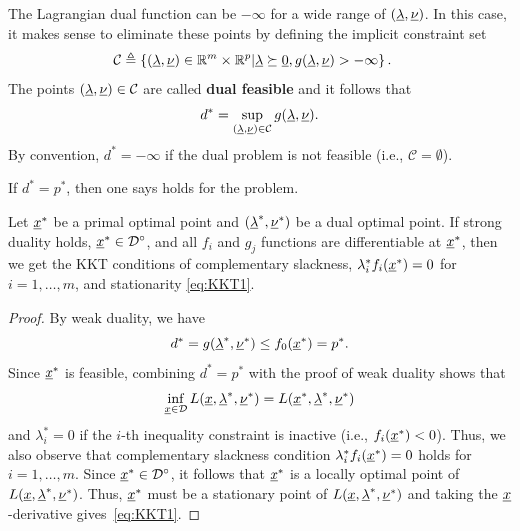 The Lagrangian dual function can be $-\infty$ for a wide range of $(\underline{\lambda},\underline{\nu})$.
In this case, it makes sense to eliminate these points by defining the implicit constraint set
\begin{align*}
\mathcal{C} &\triangleq \left\{ (\underline{\lambda},\underline{\nu}) \in \mathbb{R}^m \times \mathbb{R}^p | \underline{\lambda}\succeq \underline{0},  g(\underline{\lambda},\underline{\nu}) > -\infty \right\}.
\end{align*}
The points $(\underline{\lambda},\underline{\nu}) \in \mathcal{C}$ are called \textbf{dual feasible} and it follows that
\[ d^* = \sup_{(\underline{\lambda},\underline{\nu})\in \mathcal{C}} g(\underline{\lambda},\underline{\nu}). \]
By convention, $d^* = -\infty$ if the dual problem is not feasible (i.e., $\mathcal{C} = \emptyset$).

\begin{definition}
If $d^* = p^*$, then one says  holds for the problem.
\end{definition}

\begin{theorem}
Let $\underline{x}^*$ be a primal optimal point and $(\underline{\lambda}^*,\underline{\nu}^*)$ be a dual optimal point.
If strong duality holds, $\underline{x}^* \in {\mathcal{D}}^{\circ}$, and all $f_i$ and $g_j$ functions are differentiable at $\underline{x}^*$, then we get the KKT conditions of complementary slackness, $\lambda_i^* f_i (\underline{x}^*) = 0$ for $i = 1,\ldots,m$, and stationarity \eqref{eq:KKT1}.
\end{theorem}
\begin{proof}
By weak duality, we have
\[ d^* = g(\underline{\lambda}^*,\underline{\nu}^*) \leq f_0 (\underline{x}^*) = p^*. \]
Since $\underline{x}^*$ is feasible, combining $d^* = p^*$ with the proof of weak duality shows that
\[ \inf_{\underline{x}\in \mathcal{D}} L(\underline{x},\underline{\lambda}^*,\underline{\nu}^*) = L(\underline{x}^*,\underline{\lambda}^*,\underline{\nu}^*) \]
and $\lambda_i^* = 0$ if the $i$-th inequality constraint is inactive (i.e., $f_i(\underline{x}^*) < 0$).
Thus, we also observe that complementary slackness condition $\lambda_i^* f_i (\underline{x}^*) = 0$ holds for $i = 1,\ldots,m$.
Since $\underline{x}^* \in {\mathcal{D}}^{\circ}$, it follows that $\underline{x}^*$ is a locally optimal point of $L(\underline{x},\underline{\lambda}^*,\underline{\nu}^*)$.
Thus, $\underline{x}^*$ must be a stationary point of $L(\underline{x},\underline{\lambda}^*,\underline{\nu}^*)$ and taking the $\underline{x}$-derivative gives~\eqref{eq:KKT1}.
\end{proof}

